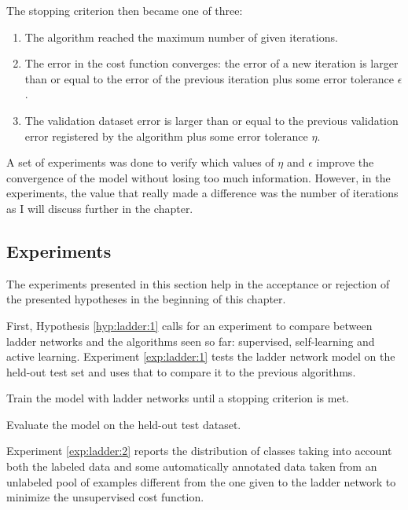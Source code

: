The stopping criterion then became one of three:

\begin{enumerate}
  \item The algorithm reached the maximum number of given iterations.
  \item The error in the cost function converges: the error of a new iteration
    is larger than or equal to the error of the previous iteration plus some
    error tolerance $\epsilon$.
  \item The validation dataset error is larger than or equal to the previous
    validation error registered by the algorithm plus some error tolerance
    $\eta$.
\end{enumerate}

A set of experiments was done to verify which values of $\eta$ and $\epsilon$
improve the convergence of the model without losing too much information.
However, in the experiments, the value that really made a difference was the
number of iterations as I will discuss further in the chapter.

\subsection{Experiments}

The experiments presented in this section help in the acceptance or rejection
of the presented hypotheses in the beginning of this chapter.

First, Hypothesis \ref{hyp:ladder:1} calls for an experiment to compare between
ladder networks and the algorithms seen so far: supervised, self-learning and
active learning. Experiment \ref{exp:ladder:1} tests the ladder network model
on the held-out test set and uses that to compare it to the previous
algorithms.

\begin{experiment}\label{exp:ladder:1}
  \begin{enumexp}
    \item Train the model with ladder networks until a stopping criterion is
      met.
    \item Evaluate the model on the held-out test dataset.
  \end{enumexp}
\end{experiment}

Experiment \ref{exp:ladder:2} reports the distribution of classes taking into
account both the labeled data and some automatically annotated data taken from
an unlabeled pool of examples different from the one given to the ladder
network to minimize the unsupervised cost function.

